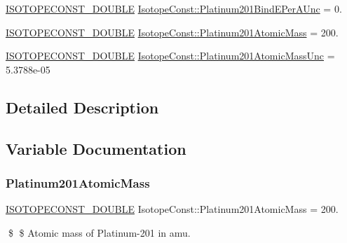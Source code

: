 \begin{DoxyCompactItemize}
\mbox{\hyperlink{group___isotope_const-_macros_ga8f45a7272ce02c0b4c65c44636ed719a}{I\+S\+O\+T\+O\+P\+E\+C\+O\+N\+S\+T\+\_\+\+D\+O\+U\+B\+LE}} \mbox{\hyperlink{group___isotope_const-_platinum-_pt201_ga5b5f79090d4fe9e8dc25123a66d8c3eb}{Isotope\+Const\+::\+Platinum201\+Bind\+E\+Per\+A\+Unc}} = 0.
\item 
\mbox{\hyperlink{group___isotope_const-_macros_ga8f45a7272ce02c0b4c65c44636ed719a}{I\+S\+O\+T\+O\+P\+E\+C\+O\+N\+S\+T\+\_\+\+D\+O\+U\+B\+LE}} \mbox{\hyperlink{group___isotope_const-_platinum-_pt201_ga108c8b9eed91fc203476139c6f37a4e5}{Isotope\+Const\+::\+Platinum201\+Atomic\+Mass}} = 200.
\item 
\mbox{\hyperlink{group___isotope_const-_macros_ga8f45a7272ce02c0b4c65c44636ed719a}{I\+S\+O\+T\+O\+P\+E\+C\+O\+N\+S\+T\+\_\+\+D\+O\+U\+B\+LE}} \mbox{\hyperlink{group___isotope_const-_platinum-_pt201_ga76b9b0a331da686021d7cc2dfa69fd8c}{Isotope\+Const\+::\+Platinum201\+Atomic\+Mass\+Unc}} = 5.\+3788e-\/05
\end{DoxyCompactItemize}


\subsection{Detailed Description}


\subsection{Variable Documentation}
\mbox{\label{group___isotope_const-_platinum-_pt201_ga108c8b9eed91fc203476139c6f37a4e5}} 
\subsubsection{\texorpdfstring{Platinum201\+Atomic\+Mass}{Platinum201AtomicMass}}
{\footnotesize\ttfamily \mbox{\hyperlink{group___isotope_const-_macros_ga8f45a7272ce02c0b4c65c44636ed719a}{I\+S\+O\+T\+O\+P\+E\+C\+O\+N\+S\+T\+\_\+\+D\+O\+U\+B\+LE}} Isotope\+Const\+::\+Platinum201\+Atomic\+Mass = 200.}

\$ \$ Atomic mass of Platinum-\/201 in amu. \mbox{\label{group___isotope_const-_platinum-_pt201_ga76b9b0a331da686021d7cc2dfa69fd8c}} 
